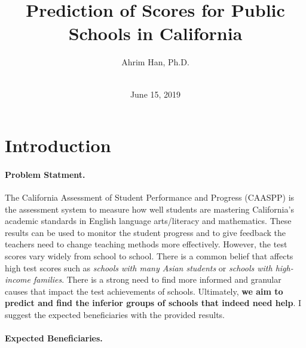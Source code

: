 \documentclass[11pt]{article}
\begin{document}
 



\title{Prediction of Scores for Public Schools in California}

\author
{Ahrim Han, Ph.D.\\
\\
}


\date{June 15, 2019}





\maketitle 
\newpage

\doublespacing
\tableofcontents
\singlespacing
\newpage

\baselineskip24pt

\section{Introduction}

\paragraph*{Problem Statment.}

The California Assessment of Student Performance and Progress (CAASPP) is the assessment system to measure how well students are mastering California’s academic standards in English language arts/literacy and mathematics. These results can be used to monitor the student progress and to give feedback the teachers need to change teaching methods more effectively. However, the test scores vary widely from school to school. There is a common belief that affects high test scores such as \textit{schools with many Asian students} or \textit{schools with high-income families}. There is a strong need to find more informed and granular causes that impact the test achievements of schools. 
%
Ultimately, \textbf{we aim to predict and find the inferior groups of schools that indeed need help}. I suggest the expected beneficiaries with the provided results.

\paragraph*{Expected Beneficiaries.}
\end{document}
